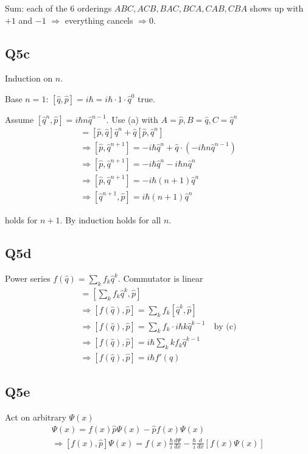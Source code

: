 \documentclass[
]{article}
\providecommand{\Rarr}{\Rightarrow}
\begin{document}
Sum: each of the 6 orderings \(ABC,ACB,BAC,BCA,CAB,CBA\) shows up with \(+1\) and \(-1\) \(\Rarr\) everything cancels \(\Rarr 0\).

\subsection{Q5c}

Induction on \(n\).

Base \(n=1\): \([\hat{q},\hat{p}]=i\hbar=i\hbar\cdot 1\cdot \hat{q}^0\) true.

Assume \([\hat{q}^n,\hat{p}]=i\hbar n\hat{q}^{n-1}\). Use (a) with \(A=\hat{p},B=\hat{q},C=\hat{q}^n\)
\begin{gather*}
	[\hat{p},\hat{q}\hat{q}^n]=[\hat{p},\hat{q}]\hat{q}^n+\hat{q}[\hat{p},\hat{q}^n]\\
	\Rarr [\hat{p},\hat{q}^{n+1}]=-i\hbar\hat{q}^n+\hat{q}\cdot(-i\hbar n\hat{q}^{n-1})\\
	\Rarr [\hat{p},\hat{q}^{n+1}]=-i\hbar\hat{q}^n-i\hbar n\hat{q}^n\\
	\Rarr [\hat{p},\hat{q}^{n+1}]=-i\hbar(n+1)\hat{q}^n\\
	\Rarr [\hat{q}^{n+1},\hat{p}]=i\hbar(n+1)\hat{q}^n
\end{gather*}

holds for \(n+1\). By induction holds for all \(n\).

\subsection{Q5d}

Power series \(f(\hat{q})=\sum_k f_k \hat{q}^k\). Commutator is linear
\begin{gather*}
	[f(\hat{q}),\hat{p}]=\left[\sum_k f_k\hat{q}^k,\hat{p}\right]\\
	\Rarr [f(\hat{q}),\hat{p}]=\sum_k f_k [\hat{q}^k,\hat{p}]\\
	\Rarr [f(\hat{q}),\hat{p}]=\sum_k f_k\cdot i\hbar k\hat{q}^{k-1} \quad\text{by (c)}\\
	\Rarr [f(\hat{q}),\hat{p}]=i\hbar\sum_k k f_k\hat{q}^{k-1}\\
	\Rarr [f(\hat{q}),\hat{p}]=i\hbar f'(\hat{q})
\end{gather*}

\subsection{Q5e}

Act on arbitrary \(\Psi(x)\)
\begin{gather*}
	[f(x),\hat{p}]\Psi(x)=f(x)\hat{p}\Psi(x)-\hat{p}f(x)\Psi(x)\\
	\Rarr [f(x),\hat{p}]\Psi(x)=f(x)\tfrac{\hbar}{i}\tfrac{d\Psi}{dx}-\tfrac{\hbar}{i}\tfrac{d}{dx}[f(x)\Psi(x)]
\end{gather*}
\end{document}
